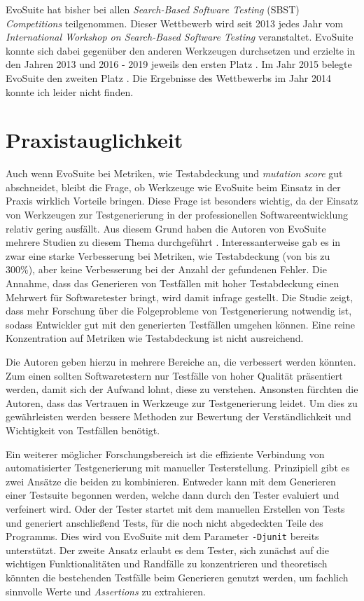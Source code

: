 \documentclass[a4paper,11pt]{article}
\begin{document}
EvoSuite hat bisher bei allen \textit{Search-Based Software Testing} (SBST) \textit{Competitions} teilgenommen.
Dieser Wettbewerb wird seit 2013 jedes Jahr vom \textit{International Workshop on Search-Based Software Testing} veranstaltet.
EvoSuite konnte sich dabei gegenüber den anderen Werkzeugen durchsetzen und erzielte in den Jahren 2013 und 2016 - 2019 jeweils den ersten Platz \cite{6571663, 7810701, 7967958, 8452806, 8812209}.
Im Jahr 2015 belegte EvoSuite den zweiten Platz \cite{7173585}.
Die Ergebnisse des Wettbewerbs im Jahr 2014 konnte ich leider nicht finden.

\section{Praxistauglichkeit}
\label{sec:praxistauglichkeit}

Auch wenn EvoSuite bei Metriken, wie Testabdeckung und \textit{mutation score} gut abschneidet, bleibt die Frage, ob Werkzeuge wie EvoSuite beim Einsatz in der Praxis wirklich Vorteile bringen.
Diese Frage ist besonders wichtig, da der Einsatz von Werkzeugen zur Testgenerierung in der professionellen Softwareentwicklung relativ gering ausfällt.
Aus diesem Grund haben die Autoren von EvoSuite mehrere Studien zu diesem Thema durchgeführt \cite{ISSTA13_Study, ISSTA15_Study, TOSEM_userstudy}.
Interessanterweise gab es in \cite{TOSEM_userstudy} zwar eine starke Verbesserung bei Metriken, wie Testabdeckung (von bis zu 300\%), aber keine Verbesserung bei der Anzahl der gefundenen Fehler.
Die Annahme, dass das Generieren von Testfällen mit hoher Testabdeckung einen Mehrwert für Softwaretester bringt, wird damit infrage gestellt.
Die Studie zeigt, dass mehr Forschung über die Folgeprobleme von Testgenerierung notwendig ist, sodass Entwickler gut mit den generierten Testfällen umgehen können.
Eine reine Konzentration auf Metriken wie Testabdeckung ist nicht ausreichend.

Die Autoren geben hierzu in \cite{TOSEM_userstudy} mehrere Bereiche an, die verbessert werden könnten.
Zum einen sollten Softwaretestern nur Testfälle von hoher Qualität präsentiert werden, damit sich der Aufwand lohnt, diese zu verstehen.
Ansonsten fürchten die Autoren, dass das Vertrauen in Werkzeuge zur Testgenerierung leidet.
Um dies zu gewährleisten werden bessere Methoden zur Bewertung der Verständlichkeit und Wichtigkeit von Testfällen benötigt.

Ein weiterer möglicher Forschungsbereich ist die effiziente Verbindung von automatisierter Testgenerierung mit manueller Testerstellung.
Prinzipiell gibt es zwei Ansätze die beiden zu kombinieren.
Entweder kann mit dem Generieren einer Testsuite begonnen werden, welche dann durch den Tester evaluiert und verfeinert wird.
Oder der Tester startet mit dem manuellen Erstellen von Tests und generiert anschließend Tests, für die noch nicht abgedeckten Teile des Programms.
Dies wird von EvoSuite mit dem Parameter \texttt{-Djunit} bereits unterstützt.
Der zweite Ansatz erlaubt es dem Tester, sich zunächst auf die wichtigen Funktionalitäten und Randfälle zu konzentrieren und theoretisch könnten die bestehenden Testfälle beim Generieren genutzt werden, um fachlich sinnvolle Werte und \textit{Assertions} zu extrahieren.
\end{document}
